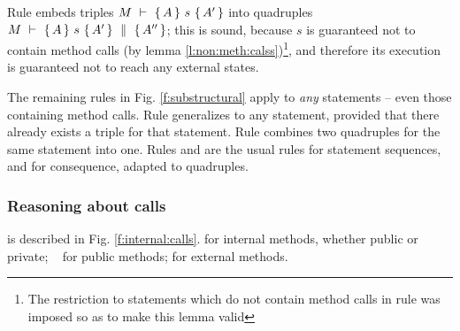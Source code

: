 {Rule {} embeds  triples  ${\hproves{M}  {A} {\ s\ }{A'} }$  into quadruples ${M\ \vdash\ \{\,A\, \} \ s\  \{\,A'\, \}\, \,\parallel\,\, \{\, A'' \, \} }$; this is sound, because $s$ is guaranteed not to contain method calls (by lemma \ref{l:non:meth:calss})\footnote{The restriction to statements which do not contain method calls in rule {} was imposed so as to make this lemma valid}, and therefore its execution is guaranteed not to reach any external states.

 
The remaining rules in Fig. \ref{f:substructural} apply to \emph{any} statements -- even those containing method calls.
 Rule {} generalizes {} to any statement, provided that  there already exists a triple for that statement.
Rule {} combines two quadruples for the same statement into one.
Rules  {} and  {} are the usual rules for statement sequences, and for consequence, adapted to quadruples.



\subsubsection{Reasoning about   calls}
is described in Fig. \ref{f:internal:calls}. {} for internal methods, whether public or private;  \  {} for public methods;   {} 
for  external methods.


}

